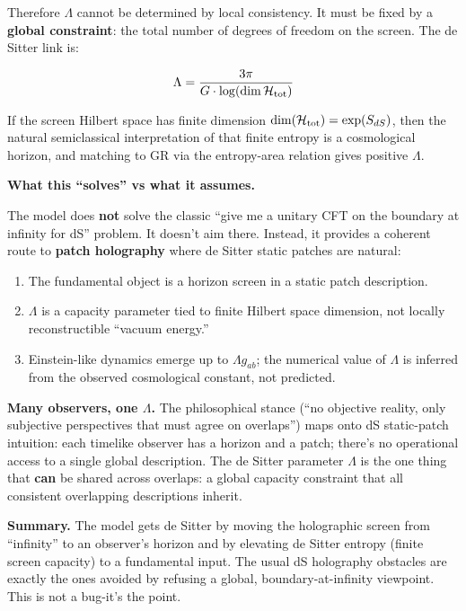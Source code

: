 \documentclass[11pt,a4paper]{article}
\theoremstyle{remark}
\providecommand{\tightlist}{%
  \setlength{\itemsep}{0pt}\setlength{\parskip}{0pt}}
\begin{document}
Therefore \(\Lambda\) cannot be determined by local consistency. It must be
fixed by a \textbf{global constraint}: the total number of degrees of freedom on
the screen. The de Sitter link is:

\[
\Lambda = \frac{3\pi}{G \cdot \log(\dim \mathcal{H}_{\rm tot})}
\]

If the screen Hilbert space has finite dimension \(\dim(\mathcal{H}_{\rm tot})
= \exp(S_{dS})\), then the natural semiclassical interpretation of that
finite entropy is a cosmological horizon, and matching to GR via the
entropy-area relation gives positive \(\Lambda\).

\textbf{What this ``solves'' vs what it assumes.}

The model does \textbf{not} solve the classic ``give me a unitary CFT on the
boundary at infinity for dS'' problem. It doesn't aim there. Instead, it
provides a coherent route to \textbf{patch holography} where de Sitter static
patches are natural:

\begin{enumerate}
\def\labelenumi{\arabic{enumi}.}
\tightlist
\item
  The fundamental object is a horizon screen in a static patch description.
\item
  \(\Lambda\) is a capacity parameter tied to finite Hilbert space dimension,
  not locally reconstructible ``vacuum energy.''
\item
  Einstein-like dynamics emerge up to \(\Lambda g_{ab}\); the numerical
  value of \(\Lambda\) is inferred from the observed cosmological constant,
  not predicted.
\end{enumerate}

\textbf{Many observers, one \(\Lambda\).} The philosophical stance (``no objective
reality, only subjective perspectives that must agree on overlaps'') maps
onto dS static-patch intuition: each timelike observer has a horizon and a
patch; there's no operational access to a single global description. The
de Sitter parameter \(\Lambda\) is the one thing that \textbf{can} be shared
across overlaps: a global capacity constraint that all consistent
overlapping descriptions inherit.

\textbf{Summary.} The model gets de Sitter by moving the holographic screen from
``infinity'' to an observer's horizon and by elevating de Sitter entropy
(finite screen capacity) to a fundamental input. The usual dS holography
obstacles are exactly the ones avoided by refusing a global,
boundary-at-infinity viewpoint. This is not a bug-it's the point.
\end{document}
